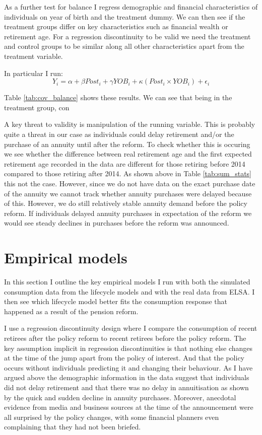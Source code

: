 \documentclass[12pt]{article}
\begin{document}
As a further test for balance I regress demographic and financial characteristics of individuals on year of birth and the treatment dummy.
We can then see if the treatment groups differ on key characteristics such as financial wealth or retirement age.
For a regression discontinuity to be valid we need the treatment and control groups to be similar along
all other characteristics apart from the treatment variable.

In particular I run:
\begin{equation*}
    Y_{i} = \alpha + \beta Post_{i} + \gamma YOB_{i} + \kappa (Post_{i} \times YOB_{i}) + \epsilon_{i}
\end{equation*}



Table \ref{tab:cov_balance} shows these results. We can see that being in the treatment group, con


A key threat to validity is manipulation of the running variable. This is probably quite a threat in our case
as individuals could delay retirement and/or the purchase of an annuity until after the reform. To check whether
this is occuring we see whether the difference between real retirement age and the first expected retirement age
recorded in the data are different for those retiring before 2014 compared to those retiring after 2014. As shown
above in Table \ref{tab:sum_stats} this not the case. However, since we do not have data on the exact purchase
date of the annuity we cannot track whether annuity purchases were delayed because of this. However, we do still
relatively stable annuity demand before the policy reform. If individuals delayed annuity purchases in expectation
of the reform we would see steady declines in purchases before the reform was announced.


\section{Empirical models}

In this section I outline the key empirical models I run with both the simulated consumption data from the
lifecycle models and with the real data from ELSA. I then see which lifecycle model better fits the consumption
response that happened as a result of the pension reform.

I use a regression discontinuity design where I compare the consumption of recent retirees after the policy reform
to recent retirees before the policy reform. The key assumption implicit in regression discontinuities is
that nothing else changes at the time of the jump apart from the policy of interest. And that the policy occurs
without individuals predicting it and changing their behaviour. As I have argued above the demographic information in the
data suggest that individuals did not delay retirement and that there was no delay in annuitisation as shown by the quick
and sudden decline in annuity purchases. Moreover, anecdotal evidence from media and business sources at the time of the
announcement were all surprised by the policy changes, with some financial planners even complaining that they had not been
briefed.
\end{document}
